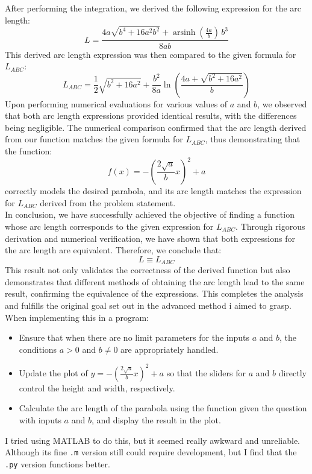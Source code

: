 \documentclass[a4paper, 12pt]{report}
\begin{document}
After performing the integration, we derived the following expression for the arc length:
\[L = \frac{4a \sqrt{b^{4} + 16a^{2} b^{2}} + \operatorname{arsinh}\left(\frac{4a}{b}\right) \, b^{3}}{8ab}\]
This derived arc length expression was then compared to the given formula for \( L_{ABC} \):
\[L_{ABC} = \frac{1}{2} \sqrt{b^2 + 16a^2} + \frac{b^2}{8a} \ln \left( \frac{4a + \sqrt{b^2 + 16a^2}}{b} \right)\]
Upon performing numerical evaluations for various values of \( a \) and \( b \), we observed that both arc length expressions provided identical results, with the differences being negligible. The numerical comparison confirmed that the arc length derived from our function matches the given formula for \( L_{ABC} \), thus demonstrating that the function:
\[f(x) = -\left(\frac{2\sqrt{a}}{b}x\right)^2 + a\]
correctly models the desired parabola, and its arc length matches the expression for \( L_{ABC} \) derived from the problem statement.\\
In conclusion, we have successfully achieved the objective of finding a function whose arc length corresponds to the given expression for \( L_{ABC} \). Through rigorous derivation and numerical verification, we have shown that both expressions for the arc length are equivalent. Therefore, we conclude that:
\[L \equiv L_{ABC}\]
This result not only validates the correctness of the derived function but also demonstrates that different methods of obtaining the arc length lead to the same result, confirming the equivalence of the expressions. This completes the analysis and fulfills the original goal set out in the advanced method i aimed to grasp.\\[1em]


    When implementing this in a program:
    \begin{itemize}[itemsep=-0.1cm]
        \item Ensure that when there are no limit parameters for the inputs \(a\) and \(b\), the conditions \(a > 0\) and \(b \neq 0\) are appropriately handled.
        \item Update the plot of \(y = -\left(\frac{2\sqrt{a}}{b}x\right)^2 + a\) so that the sliders for \(a\) and \(b\) directly control the height and width, respectively.
        \item Calculate the arc length of the parabola using the function given the question with inputs \(a\) and \(b\), and display the result in the plot.
    \end{itemize}
    \raggedright
    
    I tried using MATLAB to do this, but it seemed really awkward and unreliable. Although its fine \texttt{.m} version still could require development, but I find that the \texttt{.py} version functions better.
\end{document}

